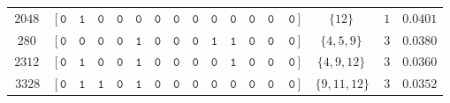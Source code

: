 \documentclass[letterpaper,11pt]{article}
\newcommand{\set}[1]{\{ #1 \}}
\newcommand{\bcode}[1]{\texttt{#1}}
\theoremstyle{definition} \newtheorem{remark}{Remark}
\begin{document}
\begin{table}[!hbt]
\begin{tabular}{c|ccccccccccccc|c|c||c}
    $2048\,$ & $\![\,\bcode{0}$ & $\bcode{1}$ & $\bcode{0}$ & $\bcode{0}$ & $\bcode{0}$ & $\bcode{0}$ & $\bcode{0}$ & $\bcode{0}$ & $\bcode{0}$ & $\bcode{0}$ & $\bcode{0}$ & $\bcode{0}$ & $\,\bcode{0}\,]$ & $\set{12}\,$ & $1$ & $0.0401$ \\

    $280\,$ & $\![\,\bcode{0}$ & $\bcode{0}$ & $\bcode{0}$ & $\bcode{0}$ & $\bcode{1}$ & $\bcode{0}$ & $\bcode{0}$ & $\bcode{0}$ & $\bcode{1}$ & $\bcode{1}$ & $\bcode{0}$ & $\bcode{0}$ & $\,\bcode{0}\,]$ & $\set{4,5,9}\,$ & $3$ & $0.0380$ \\

    $2312\,$ & $\![\,\bcode{0}$ & $\bcode{1}$ & $\bcode{0}$ & $\bcode{0}$ & $\bcode{1}$ & $\bcode{0}$ & $\bcode{0}$ & $\bcode{0}$ & $\bcode{0}$ & $\bcode{1}$ & $\bcode{0}$ & $\bcode{0}$ & $\,\bcode{0}\,]$ & $\set{4,9,12}\,$ & $3$ & $0.0360$ \\

    $\,3328\,$ & $\![\,\bcode{0}$ & $\bcode{1}$ & $\bcode{1}$ & $\bcode{0}$ & $\bcode{1}$ & $\bcode{0}$ & $\bcode{0}$ & $\bcode{0}$ & $\bcode{0}$ & $\bcode{0}$ & $\bcode{0}$ & $\bcode{0}$ & $\,\bcode{0}\,]$ & $\,\set{9,11,12}\,$ & $3$ & $0.0352$
    \\
    \hline
\end{tabular}
\end{table}
\end{document}
